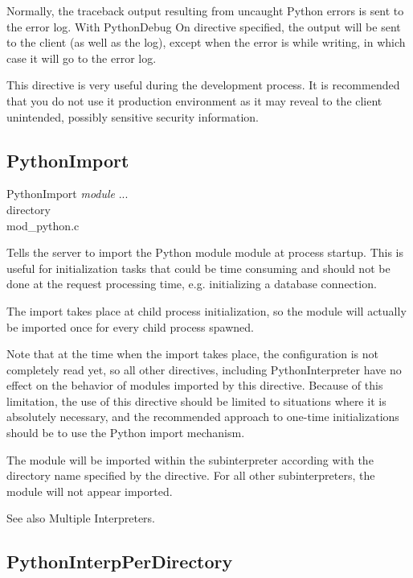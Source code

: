 Normally, the traceback output resulting from uncaught Python errors
is sent to the error log. With PythonDebug On directive specified, the
output will be sent to the client (as well as the log), except when
the error is  while writing, in which case it will go
to the error log.

This directive is very useful during the development process. It is
recommended that you do not use it production environment as it may
reveal to the client unintended, possibly sensitive security
information.

\subsection{PythonImport\label{dir-other-pi}}

PythonImport \emph{module} ... \\
directory\\
mod_python.c

Tells the server to import the Python module module at process
startup. This is useful for initialization tasks that could be time
consuming and should not be done at the request processing time,
e.g. initializing a database connection.

The import takes place at child process initialization, so the module
will actually be imported once for every child process spawned.

Note that at the time when the import takes place, the configuration
is not completely read yet, so all other directives, including
PythonInterpreter have no effect on the behavior of modules imported
by this directive. Because of this limitation, the use of this
directive should be limited to situations where it is absolutely
necessary, and the recommended approach to one-time initializations
should be to use the Python import mechanism.

The module will be imported within the subinterpreter according with
the directory name specified by the  directive. For
all other subinterpreters, the module will not appear imported.

See also Multiple Interpreters. 

\subsection{PythonInterpPerDirectory\label{dir-other-ipd}}

